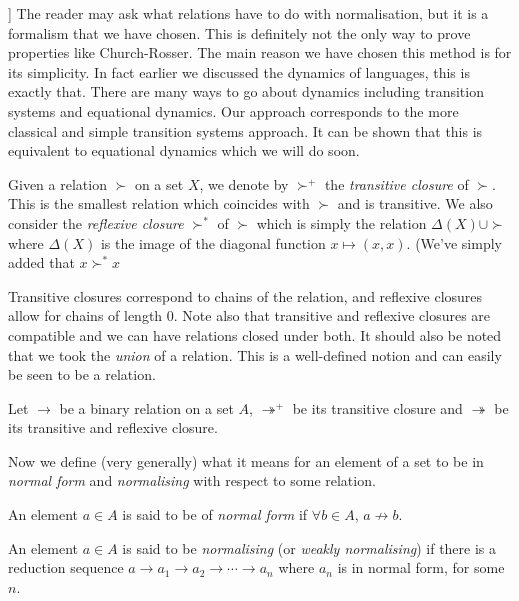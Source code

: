 \begin{remark}
[[CLEAN THIS UP]]
    The reader may ask what relations have to do with normalisation, but it is a formalism that we have chosen. This is definitely not the only way to prove properties like Church-Rosser. The main reason we have chosen this method is for its simplicity. In fact earlier we discussed the dynamics of languages, this is exactly that. There are many ways to go about dynamics including transition systems and equational dynamics. Our approach corresponds to the more classical and simple transition systems approach. It can be shown that this is equivalent to equational dynamics which we will do soon.
\end{remark}

\begin{defin}
    Given a relation $\succ$ on a set $X$, we denote by $\succ^+$ the \emph{transitive closure} of $\succ$. This is the smallest relation which coincides with $\succ$ and is transitive. We also consider the \emph{reflexive closure} $\succ^*$ of $\succ$ which is simply the relation $\Delta(X)\cup \succ $ where $\Delta(X)$ is the image of the diagonal function $x \mapsto (x,x)$. (We've simply added that $x \succ^* x$
\end{defin}

\begin{remark}
    Transitive closures correspond to chains of the relation, and reflexive closures allow for chains of length $0$. Note also that transitive and reflexive closures are compatible and we can have relations closed under both. It should also be noted that we took the \emph{union} of a relation. This is a well-defined notion and can easily be seen to be a relation.
\end{remark}

Let $\to$ be a binary relation on a set $A$, $\twoheadrightarrow^+$ be its transitive closure and $\twoheadrightarrow$ be its transitive and reflexive closure.

Now we define (very generally) what it means for an element of a set to be in \emph{normal form} and \emph{normalising} with respect to some relation.

\begin{defin}
    An element $a \in A$ is said to be of \emph{normal form} if $\forall b \in A$, $a {\not \to} b$.
\end{defin}

\begin{defin}
    An element $a \in A$ is said to be \emph{normalising} (or \emph{weakly normalising}) if there is a reduction sequence $a \to a_1 \to a_2 \to \cdots \to a_n$ where $a_n$ is in normal form, for some $n$.
\end{defin}

